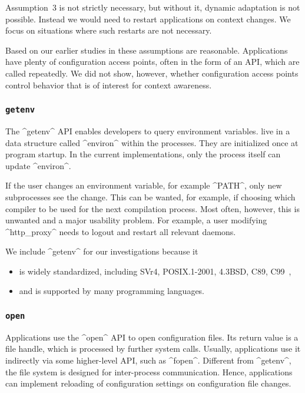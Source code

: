 Assumption~3 is not strictly necessary, but without it, dynamic adaptation is not possible.
Instead we would need to restart applications on context changes.
We focus on situations where such restarts are not necessary.

Based on our earlier studies in  these assumptions are reasonable.
Applications have plenty of configuration access points, often in the form of an API, which are called repeatedly.
We did not show, however, whether configuration access points control behavior that is of interest for context awareness.

\subsubsection{\texttt{getenv}}

The ^getenv^ API enables developers to query environment variables.
 live in a data structure called ^environ^ within the processes.
They are initialized once at program startup.
In the current implementations, only the process itself can update ^environ^.

If the user changes an environment variable, for example ^PATH^, only new subprocesses see the change.
This can be wanted, for example, if choosing which compiler to be used for the next compilation process.
Most often, however, this is unwanted and a major usability problem.
For example, a user modifying ^http_proxy^ needs to logout and restart all relevant daemons.

We include ^getenv^ for our investigations because it~\cite{raab2017introducing}
\begin{itemize}
\item is widely standardized, including SVr4, POSIX.1-2001, 4.3BSD, C89, C99~\cite{man2017getenv},
\item and is supported by many programming languages.
\end{itemize}

\subsubsection{\texttt{open}}

Applications use the ^open^ API to open configuration files.
Its return value is a file handle, which is processed by further system calls.
Usually, applications use it indirectly via some higher-level API, such as ^fopen^.
Different from ^getenv^, the file system is designed for inter-process communication.
Hence, applications can implement reloading of configuration settings on configuration file changes.

